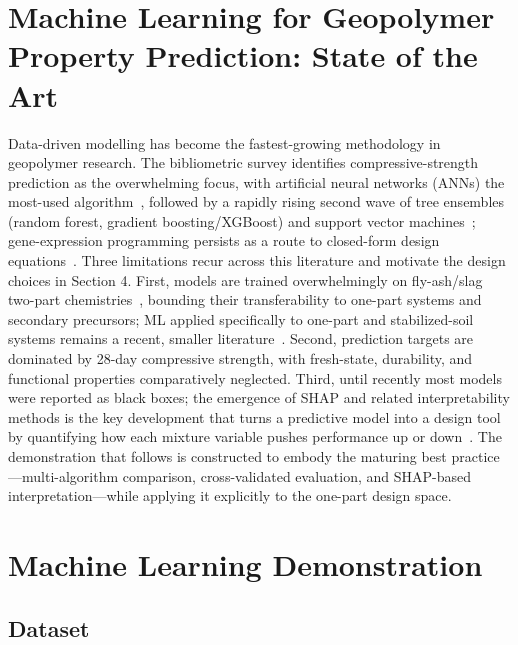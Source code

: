 \documentclass[materials,article,submit,pdftex,moreauthors]{Definitions/mdpi}
\begin{document}
\section{Machine Learning for Geopolymer Property Prediction: State of the Art}
Data-driven modelling has become the fastest-growing methodology in geopolymer research. The bibliometric survey identifies compressive-strength prediction as the overwhelming focus, with artificial neural networks (ANNs) the most-used algorithm~\cite{ref1,ref2,ref6,ref11}, followed by a rapidly rising second wave of tree ensembles (random forest, gradient boosting/XGBoost) and support vector machines~\cite{ref9,ref10}; gene-expression programming persists as a route to closed-form design equations~\cite{ref5,ref12}. Three limitations recur across this literature and motivate the design choices in Section 4. First, models are trained overwhelmingly on fly-ash/slag two-part chemistries~\cite{ref3,ref7}, bounding their transferability to one-part systems and secondary precursors; ML applied specifically to one-part and stabilized-soil systems remains a recent, smaller literature~\cite{ref4,ref25,ref30,ref39}. Second, prediction targets are dominated by 28-day compressive strength, with fresh-state, durability, and functional properties comparatively neglected. Third, until recently most models were reported as black boxes; the emergence of SHAP and related interpretability methods is the key development that turns a predictive model into a design tool by quantifying how each mixture variable pushes performance up or down~\cite{ref8,ref38}. The demonstration that follows is constructed to embody the maturing best practice---multi-algorithm comparison, cross-validated evaluation, and SHAP-based interpretation---while applying it explicitly to the one-part design space.

\section{Machine Learning Demonstration}
\subsection{Dataset}
\end{document}
